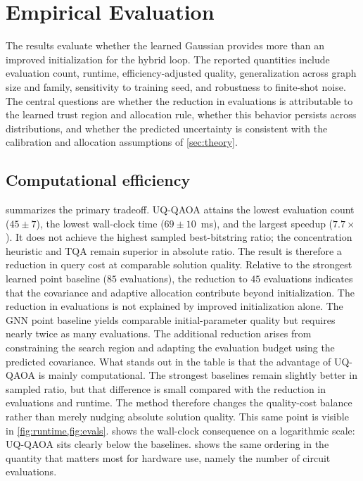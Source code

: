 \documentclass[aps,prx,reprint,superscriptaddress,longbibliography]{revtex4-2}
\newcommand{\GNN}{\textnormal{\textsc{GNN}}}
\newcommand{\UQQAOA}{\textnormal{\textsc{UQ-QAOA}}}
\begin{document}
\section{Empirical Evaluation}
\label{sec:results}

The results evaluate whether the learned Gaussian provides more than an improved
initialization for the hybrid loop. The reported quantities include
evaluation count, runtime, efficiency-adjusted quality, generalization
across graph size and family, sensitivity to training seed, and
robustness to finite-shot noise. The central questions are whether the
reduction in evaluations is attributable to the learned trust region
and allocation rule, whether this behavior persists across
distributions, and whether the predicted uncertainty is consistent with
the calibration and allocation assumptions of \cref{sec:theory}.

\subsection{Computational efficiency}
\label{sec:efficiency}

 summarizes the primary tradeoff. \UQQAOA{} attains
the lowest evaluation count ($45\pm 7$), the lowest
wall-clock time ($69\pm 10$~ms), and the largest speedup
($7.7\times$). It does not achieve the highest sampled best-bitstring
ratio; the concentration heuristic and TQA remain superior in absolute
ratio. The result is therefore a reduction in query cost at comparable
solution quality. Relative to the strongest learned point baseline
($85$ evaluations), the reduction to $45$ evaluations indicates that
the covariance and adaptive allocation contribute beyond
initialization. The reduction in evaluations is not explained by
improved initialization alone. The \GNN{} point baseline yields
comparable initial-parameter quality but requires nearly twice as many
evaluations. The additional reduction arises from constraining the
search region and adapting the evaluation budget using the predicted
covariance.
What stands out in the table is that the advantage of \UQQAOA{} is
mainly computational. The strongest baselines remain slightly better in
sampled ratio, but that difference is small compared with the reduction
in evaluations and runtime. The method therefore changes the
quality-cost balance rather than merely nudging absolute solution
quality.
This same point is visible in \cref{fig:runtime,fig:evals}.
 shows the wall-clock consequence on a logarithmic
scale: \UQQAOA{} sits clearly below the baselines. 
shows the same ordering in the quantity that matters most for hardware
use, namely the number of circuit evaluations.
\end{document}
